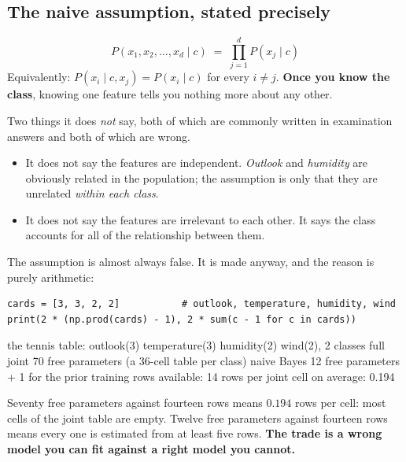 \documentclass[11pt]{article}
\begin{document}
\subsection{The naive assumption, stated precisely}
\label{sec:assumption}

\begin{keyidea}
\[
  P(x_1, x_2, \ldots, x_d \mid c) \;=\; \prod_{j=1}^{d} P(x_j \mid c)
\]
Equivalently: $P(x_i \mid c, x_j) = P(x_i \mid c)$ for every $i \neq j$.
\textbf{Once you know the class}, knowing one feature tells you nothing more
about any other.
\end{keyidea}

Two things it does \emph{not} say, both of which are commonly written in
examination answers and both of which are wrong.

\begin{itemize}[leftmargin=*]
  \item It does not say the features are independent. \emph{Outlook} and
    \emph{humidity} are obviously related in the population; the assumption
    is only that they are unrelated \emph{within each class}.
  \item It does not say the features are irrelevant to each other. It says
    the class accounts for all of the relationship between them.
\end{itemize}

The assumption is almost always false. It is made anyway, and the reason is
purely arithmetic:

\begin{lstlisting}
cards = [3, 3, 2, 2]           # outlook, temperature, humidity, wind
print(2 * (np.prod(cards) - 1), 2 * sum(c - 1 for c in cards))
\end{lstlisting}
\begin{codeout}
the tennis table: outlook(3) temperature(3) humidity(2) wind(2), 2 classes
   full joint        70 free parameters (a 36-cell table per class)
   naive Bayes       12 free parameters + 1 for the prior
   training rows available: 14
   rows per joint cell on average: 0.194
\end{codeout}

Seventy free parameters against fourteen rows means $0.194$ rows per cell:
most cells of the joint table are empty. Twelve free parameters against
fourteen rows means every one is estimated from at least five rows.
\textbf{The trade is a wrong model you can fit against a right model you
cannot.}
\end{document}
